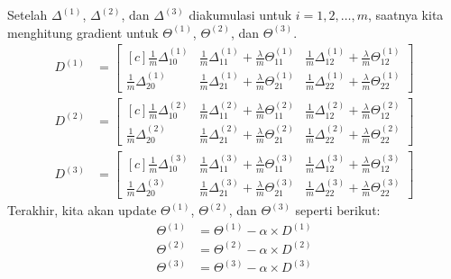 \documentclass[12pt]{article}
\begin{document}
Setelah $\Delta^{(1)}$, $\Delta^{(2)}$, dan $\Delta^{(3)}$ diakumulasi untuk $i = 1, 2, \ldots, m$, saatnya kita menghitung gradient untuk $\Theta^{(1)}$, $\Theta^{(2)}$, dan $\Theta^{(3)}$.
\begin{align}
	D^{(1)} &= \begin{bmatrix}[c]
		\frac{1}{m} \Delta_{10}^{(1)} & \frac{1}{m} \Delta_{11}^{(1)} + \frac{\lambda}{m}  \Theta_{11}^{(1)} & \frac{1}{m} \Delta_{12}^{(1)} + \frac{\lambda}{m} \Theta_{12}^{(1)} \\
		\frac{1}{m} \Delta_{20}^{(1)} & \frac{1}{m} \Delta_{21}^{(1)} + \frac{\lambda}{m} \Theta_{21}^{(1)} & \frac{1}{m} \Delta_{22}^{(1)} + \frac{\lambda}{m} \Theta_{22}^{(1)}		
	\end{bmatrix} \\
	D^{(2)} &= \begin{bmatrix}[c]
		\frac{1}{m} \Delta_{10}^{(2)} & \frac{1}{m} \Delta_{11}^{(2)} + \frac{\lambda}{m} \Theta_{11}^{(2)} & \frac{1}{m} \Delta_{12}^{(2)} + \frac{\lambda}{m} \Theta_{12}^{(2)} \\
		\frac{1}{m} \Delta_{20}^{(2)} & \frac{1}{m} \Delta_{21}^{(2)} + \frac{\lambda}{m} \Theta_{21}^{(2)} & \frac{1}{m} \Delta_{22}^{(2)} + \frac{\lambda}{m} \Theta_{22}^{(2)} 
	\end{bmatrix} \\
	D^{(3)} &= \begin{bmatrix}[c]
		\frac{1}{m} \Delta_{10}^{(3)} & \frac{1}{m} \Delta_{11}^{(3)} + \frac{\lambda}{m} \Theta_{11}^{(3)} & \frac{1}{m} \Delta_{12}^{(3)} + \frac{\lambda}{m} \Theta_{12}^{(3)} \\
		\frac{1}{m} \Delta_{20}^{(3)} & \frac{1}{m} \Delta_{21}^{(3)} + \frac{\lambda}{m} \Theta_{21}^{(3)} & \frac{1}{m} \Delta_{22}^{(3)} + \frac{\lambda}{m} \Theta_{22}^{(3)} 
	\end{bmatrix}	
\end{align}
Terakhir, kita akan update $\Theta^{(1)}$, $\Theta^{(2)}$, dan $\Theta^{(3)}$ seperti berikut:
\begin{align}
	\Theta^{(1)} &= \Theta^{(1)} - \alpha \times D^{(1)} \\
	\Theta^{(2)} &= \Theta^{(2)} - \alpha \times D^{(2)} \\
	\Theta^{(3)} &= \Theta^{(3)} - \alpha \times D^{(3)}	
\end{align}



\end{document}
